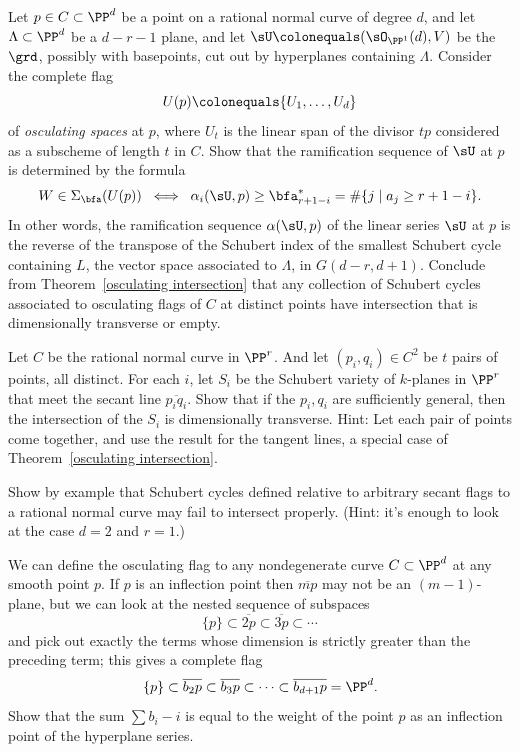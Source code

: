 \begin{exercise}\label{osculating
planes}
Let $p\in C\subset \PP^{d}$ be a point on a rational normal curve of
degree $d$, and
let $\Lambda\subset \PP^{d}$ be a $d-r-1$ plane, and let  $\sU
\colonequals (\sO_{\PP^{1}}(d), V)$
be
the  $\grd$,  possibly with basepoints, cut out by hyperplanes containing
$\Lambda$.
Consider the complete flag
$$
U(p) \colonequals  \{U_{1}, \dots, U_{d}\}
$$
of \emph{osculating spaces} at $p$, where $U_{t}$ is the linear span of
%
the divisor $tp$ considered
as a subscheme of length $t$ in $C$. Show that the ramification sequence
%
of $\sU$ at $p$
is determined by the formula
$$
W \in \Sigma_{\bfa}(U(p))
\; \iff \; \alpha_i(\sU, p) \geq \bfa^*_{r+1-i} = \#\{j\mid a_j\geq
r+1-i\}.
$$
In other words, the ramification sequence $\alpha(\sU, p)$ of the linear
series $\sU$ at $p$ is the reverse of the transpose of the Schubert
index of the smallest Schubert cycle containing $L$, the vector
space associated to $\Lambda$, in  $G(d-r, d+1)$. Conclude from
Theorem~\ref{osculating intersection}
that any collection of Schubert cycles associated to osculating flags
of $C$ at distinct points have intersection
that is dimensionally transverse or empty.
\end{exercise}

\begin{exercise}\label{independent secants 0}
Let $C$ be the rational normal curve in $\PP^{r}$. And let $(p_{i},
q_{i})\in  C^{2}$ be $t$ pairs of points, all distinct.
For each $i$, let $S_{i}$ be the Schubert variety of $k$-planes in
$\PP^{r}$ that meet the secant line
$\overline{p_{i}q_{i}}$. Show that if the $p_{i}, q_{i}$ are sufficiently
general, then the intersection
of the $S_{i}$ is dimensionally transverse. Hint: Let each pair of points
come together, and use the result
for the tangent lines, a special case of Theorem~\ref{osculating
intersection}.
\end{exercise}

\begin{exercise}\label{only general secants}
Show by example that Schubert cycles defined relative to arbitrary secant
flags to a rational normal curve may fail to intersect properly. (Hint:
it's enough to look at the case $d=2$ and $r=1$.)
\end{exercise}

\begin{exercise}
We can define the osculating flag to any nondegenerate curve $C \subset
\PP^d$ at any smooth point $p$. If $p$ is an inflection point then
$\overline{mp}$ may not be an $(m-1)$-plane, but we can look at the
nested sequence of subspaces
$$
\{p\} \subset \overline{2p} \subset \overline{3p} \subset \cdots
$$
and pick out exactly the terms whose dimension is strictly greater than
the preceding term; this gives a complete flag
$$
\{p\} \subset \overline{b_2p} \subset \overline{b_3p} \subset \dots
\subset \overline{b_{d+1}p} = \PP^d
.
$$
Show that the sum $\sum b_i - i$ is equal to the weight of the point $p$
as an inflection point of the hyperplane series.
\end{exercise}


